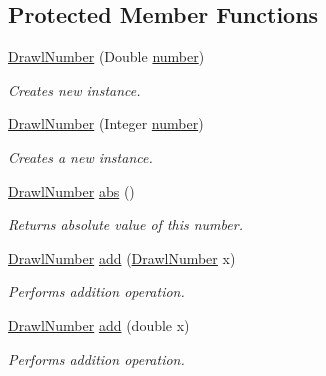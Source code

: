 \subsection*{Protected Member Functions}
\begin{DoxyCompactItemize}
\item 
\hyperlink{classcom_1_1aarrelaakso_1_1drawl_1_1_drawl_number_a81611ec54e7b92b8f95a11b2361c227d}{Drawl\+Number} (Double \hyperlink{classcom_1_1aarrelaakso_1_1drawl_1_1_drawl_number_a9fe9f40163a4f5581b35d61ecf63f278}{number})
\begin{DoxyCompactList}\small\item\em Creates new instance. \end{DoxyCompactList}\item 
\hyperlink{classcom_1_1aarrelaakso_1_1drawl_1_1_drawl_number_a2dcda5f137cd38a7a66842102d0bee04}{Drawl\+Number} (Integer \hyperlink{classcom_1_1aarrelaakso_1_1drawl_1_1_drawl_number_a9fe9f40163a4f5581b35d61ecf63f278}{number})
\begin{DoxyCompactList}\small\item\em Creates a new instance. \end{DoxyCompactList}\item 
\hyperlink{classcom_1_1aarrelaakso_1_1drawl_1_1_drawl_number}{Drawl\+Number} \hyperlink{classcom_1_1aarrelaakso_1_1drawl_1_1_drawl_number_a81855ee2830f208ee7fd212508519d7f}{abs} ()
\begin{DoxyCompactList}\small\item\em Returns absolute value of this number. \end{DoxyCompactList}\item 
\hyperlink{classcom_1_1aarrelaakso_1_1drawl_1_1_drawl_number}{Drawl\+Number} \hyperlink{classcom_1_1aarrelaakso_1_1drawl_1_1_drawl_number_aac6b91a4d4c7bbf99acd5472d39c071e}{add} (\hyperlink{classcom_1_1aarrelaakso_1_1drawl_1_1_drawl_number}{Drawl\+Number} x)
\begin{DoxyCompactList}\small\item\em Performs addition operation. \end{DoxyCompactList}\item 
\hyperlink{classcom_1_1aarrelaakso_1_1drawl_1_1_drawl_number}{Drawl\+Number} \hyperlink{classcom_1_1aarrelaakso_1_1drawl_1_1_drawl_number_ad8a8c1d2ce5aa63334b2bdce9bd7bb54}{add} (double x)
\begin{DoxyCompactList}\small\item\em Performs addition operation. \end{DoxyCompactList}\item 

\end{DoxyCompactItemize}
